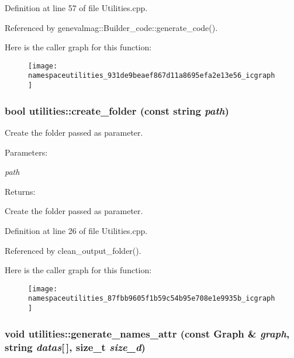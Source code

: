 Definition at line 57 of file Utilities.cpp.

Referenced by genevalmag::Builder\_\-code::generate\_\-code().

Here is the caller graph for this function:\nopagebreak
\begin{figure}[H]
\begin{center}
\leavevmode
\texttt{[image: namespaceutilities\_931de9beaef867d11a8695efa2e13e56\_icgraph]}
\end{center}
\end{figure}
\hypertarget{namespaceutilities_87fbb9605f1b59c54b95e708e1e9935b}{
\subsubsection[{create\_\-folder}]{\setlength{\rightskip}{0pt plus 5cm}bool utilities::create\_\-folder (const string {\em path})}}
\label{namespaceutilities_87fbb9605f1b59c54b95e708e1e9935b}


Create the folder passed as parameter. \begin{Desc}
\item[Parameters:]
\begin{description}
\item[{\em path}]\end{description}
\end{Desc}
\begin{Desc}
\item[Returns:]\end{Desc}
Create the folder passed as parameter. 

Definition at line 26 of file Utilities.cpp.

Referenced by clean\_\-output\_\-folder().

Here is the caller graph for this function:\nopagebreak
\begin{figure}[H]
\begin{center}
\leavevmode
\texttt{[image: namespaceutilities\_87fbb9605f1b59c54b95e708e1e9935b\_icgraph]}
\end{center}
\end{figure}
\hypertarget{namespaceutilities_c88e50b1c88f16e0d052555d773b7be5}{
\subsubsection[{generate\_\-names\_\-attr}]{\setlength{\rightskip}{0pt plus 5cm}void utilities::generate\_\-names\_\-attr (const Graph \& {\em graph}, \/  string {\em datas}\mbox{[}$\,$\mbox{]}, \/  size\_\-t {\em size\_\-d})}}
\label{namespaceutilities_c88e50b1c88f16e0d052555d773b7be5}


